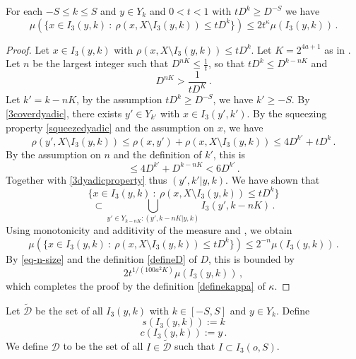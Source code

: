 \begin{lemma}
    \label{boundary-measure}
    \leanok
    For each $-S\le k\le S$ and $y\in Y_k$ and $0<t<1$
    with $tD^k\ge D^{-S}$ we have
    \begin{equation}
        \label{old-small-boundary}
        \mu(\{x \in I_3(y,k) \ : \ \rho(x, X \setminus I_3(y,k)) \leq t D^{k}\}) \le 2 t^\kappa \mu(I_3(y,k))\,.
    \end{equation}
\end{lemma}
\begin{proof}
\leanok
Let $x\in I_3(y,k)$ with $\rho(x, X \setminus I_3(y,k)) \leq t D^{k}$. Let $K = 2^{4a+1}$ as in .
Let $n$ be the largest integer such that
$D^{nK} \le \frac{1}{t}$, so that $tD^k \le D^{k-nK}$ and
\begin{equation}
\label{eq-n-size}
    D^{nK} > \frac{1}{tD^K}\,.
\end{equation}
Let $k' = k - nK$, by the assumption $tD^k \ge D^{-S}$, we have $k' \ge -S$. By \eqref{3coverdyadic}, there exists $y' \in Y_{k'}$ with $x \in I_3(y',k')$. By the squeezing property \eqref{squeezedyadic} and the assumption on $x$, we have
$$
    \rho(y', X \setminus I_3(y,k)) \le \rho(x,y') + \rho(x, X \setminus I_3(y,k)) \le 4 D^{k'} + t D^{k}\,.
$$
By the assumption on $n$ and the definition of $k'$, this is
$$
    \le 4D^{k'} + D^{k - nK} < 6D^{k'}\,.
$$
Together with \eqref{3dyadicproperty} thus $(y',k'|y,k)$. We have shown that
$$
    \{x \in I_3(y,k) \ : \ \rho(x, X \setminus I_3(y,k)) \leq t D^{k}\}
$$
$$
    \subset \bigcup_{y'\in Y_{k-nK}: (y',k-nK|y,k)}I_3(y',k-nK)\,.
$$
Using monotonicity and additivity of the measure and , we obtain
$$
    \mu(\{x \in I_3(y,k) \ : \ \rho(x, X \setminus I_3(y,k)) \leq t D^{k}\}) \le 2^{-n} \mu(I_3(y,k))\,.
$$
By \eqref{eq-n-size} and the definition \eqref{defineD} of $D$, this is bounded by
$$
    2 t^{1/(100a^2 K)}  \mu(I_3(y,k))\,,
$$
which completes the proof by the definition \eqref{definekappa} of $\kappa$.
\end{proof}

Let $\tilde{\mathcal{D}}$ be the set of all $I_3(y,k)$ with $k\in [-S,S]$ and
$y\in Y_k$. Define
\begin{equation}
s(I_3(y,k)):=k
\end{equation}
\begin{equation}
c(I_3(y,k)):=y\,.
\end{equation}
We define $\mathcal{D}$ to be the set of all $I \in \tilde{\mathcal{D}}$ such that $I \subset I_3(o, S)$.


